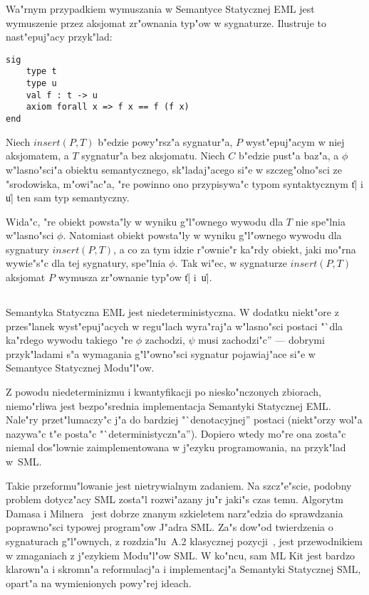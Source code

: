 Wa"rnym przypadkiem wymuszania w Semantyce Statycznej EML
jest wymuszenie przez aksjomat zr"ownania typ"ow w sygnaturze.
Ilustruje to nast"epuj"acy przyk"lad:
\begin{verbatim}
sig
    type t
    type u
    val f : t -> u
    axiom forall x => f x == f (f x)
end
\end{verbatim}
Niech $insert(P, T)$ b"edzie powy"rsz"a sygnatur"a, 
$P$ wyst"epuj"acym w niej aksjomatem, a $T$ sygnatur"a bez aksjomatu.
Niech $C$ b"edzie pust"a baz"a, a $\phi$ w"lasno"sci"a obiektu semantycznego,
sk"ladaj"acego si"e w szczeg"olno"sci ze "sro\-do\-wis\-ka,
m"owi"ac"a, "re powinno ono przypisywa"c 
typom syntaktycznym \|t| i \|u| ten sam typ semantyczny.

Wida"c, "re obiekt powsta"ly w wyniku g"l"ownego wywodu dla $T$
nie spe"lnia w"lasno"sci $\phi$.
Natomiast obiekt powsta"ly w wyniku g"l"ownego wywodu dla sygnatury $insert(P, T)$,
a co za tym idzie r"ownie"r ka"rdy obiekt, 
jaki mo"rna wywie"s"c dla tej sygnatury, spe"lnia $\phi$.
Tak wi"ec, w sygnaturze $insert(P, T)$ aksjomat $P$ wymusza zr"ownanie typ"ow \|t| i~\|u|.

\subsection{\secanaleml}
\label{sec:analeml}

Semantyka Statyczna EML jest niedeterministyczna.
W dodatku niekt"ore z przes"lanek wyst"epuj"acych w regu"lach
wyra"raj"a w"lasno"sci postaci
"`dla ka"r\-de\-go wywodu takiego "re $\phi$ zachodzi,
$\psi$ musi zachodzi"c'' --- dobrymi przyk"ladami
s"a wymagania g"l"owno"sci sygnatur pojawiaj"ace si"e w Semantyce Statycznej Mo\-du\-"l"ow.

Z powodu niedeterminizmu i kwantyfikacji po niesko"nczonych zbiorach,
niemo"rliwa jest bezpo"srednia implementacja Semantyki Statycznej EML.
Na\-le\-"ry przet"lumaczy"c j"a do bardziej "`denotacyjnej'' postaci
(niekt"orzy wol"a nazywa"c t"e posta"c "`deterministyczn"a'').
Dopiero wtedy mo"re ona zosta"c niemal dos"lownie
zaimplementowana w j"ezyku programowania, na przyk"lad w~SML.

Takie przeformu"lowanie jest nietrywialnym zadaniem.
Na szcz"e"scie, po\-dob\-ny problem dotycz"acy SML
zosta"l rozwi"azany ju"r jaki"s czas temu.
Algorytm Damasa i Milnera~\cite{DM82} jest dobrze znanym szkieletem
narz"edzia do sprawdzania poprawno"sci typowej program"ow J"adra SML.
Za"s dow"od twierdzenia o sygnaturach g"l"ownych,
z rozdzia"lu~A.2 klasycznej pozycji~\cite{MT91},
jest przewodnikiem w zmaganiach z j"ezykiem Modu"l"ow SML.
W ko"ncu, sam ML Kit jest bardzo klarown"a i skromn"a
reformulacj"a i implementacj"a Semantyki Statycznej SML,
opart"a na wymienionych powy"rej ideach.

